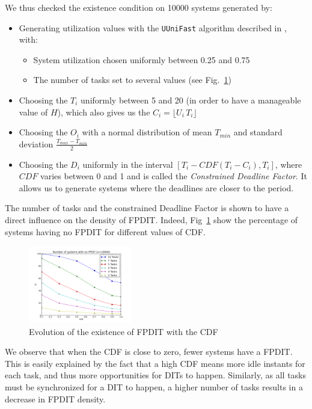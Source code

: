 \documentclass[conference]{IEEEtran}
\begin{document}
	We thus checked the existence condition on 10000 systems generated by:
	\begin{itemize}
		\item Generating utilization values with the \texttt{UUniFast} algorithm described in \cite{bini2005measuring}, with:
		\begin{itemize}
			\item System utilization chosen uniformly between 0.25 and 0.75
			\item The number of tasks set to several values (see Fig.~\ref{fig:noFPDIT})
		\end{itemize}
		\item Choosing the $T_i$ uniformly between 5 and 20 (in order to have a manageable value of $H$), which also gives us the $C_i = \lfloor U_i \, T_i \rfloor$
		\item Choosing the $O_i$ with a normal distribution of mean $T_{min}$ and standard deviation $\frac{T_{max} - T_{min}}{2}$
		\item Choosing the $D_i$ uniformly in the interval $[T_i - CDF(T_i - C_i), T_i]$, where $CDF$ varies between 0 and 1 and is called the \emph{Constrained Deadline Factor}. It allows us to generate systems where the deadlines are closer to the period.
	\end{itemize}

	The number of tasks and the constrained Deadline Factor is shown to have a direct influence on the density of FPDIT. Indeed, Fig~\ref{fig:noFPDIT} show the percentage of systems having no FPDIT for different values of CDF.

	\begin{figure}[h]
	\begin{center}
		\includegraphics[width=0.4\textwidth]{figs/nofpdit_4.png}
	\end{center}
	\caption{Evolution of the existence of FPDIT with the CDF}
	\label{fig:noFPDIT}
	\end{figure}

	We observe that when the CDF is close to zero, fewer systems have a FPDIT.
	This is easily explained by the fact that
	a high CDF means more idle instants for each task, and thus more opportunities
	for DITs to happen. Similarly, as all tasks must be synchronized for a DIT to
	happen, a higher number of tasks results in a decrease in FPDIT density.
\end{document}
